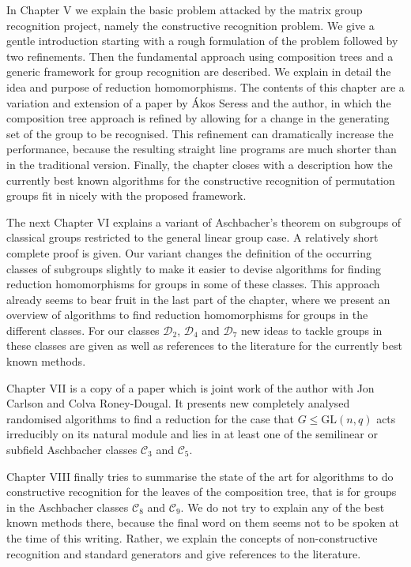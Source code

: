 \documentclass[11pt]{article}
\begin{document}
In Chapter V we explain the basic problem attacked by the matrix group
recognition project, namely the constructive recognition problem. We
give a gentle introduction starting with a rough formulation of the
problem followed by two refinements. Then the fundamental approach using 
composition trees and a generic framework for group recognition
are described. We explain in detail the idea and purpose of reduction
homomorphisms. The contents of this chapter are a variation and
extension of a paper by \'{A}kos Seress and the author, in which the
composition tree approach is refined by allowing for a change in
the generating set of the group to be recognised. This refinement can
dramatically increase the performance, because the resulting straight
line programs are much shorter than in the traditional version. Finally,
the chapter closes with a description how the currently best known
algorithms for the constructive recognition of permutation groups fit in
nicely with the proposed framework.

The next Chapter VI explains a variant of Aschbacher’s theorem on
subgroups of classical groups restricted to the general linear group
case. A relatively short complete proof is given. Our variant changes
the definition of the occurring classes of subgroups slightly to make
it easier to devise algorithms for finding reduction homomorphisms
for groups in some of these classes. This approach already seems
to bear fruit in the last part of the chapter, where we present an
overview of algorithms to find reduction homomorphisms for groups in the
different classes. For our classes $\mathcal{D}_2$, $\mathcal{D}_4$ and
$\mathcal{D}_7$ new ideas to tackle groups in these classes are given
as well as references to the literature for the currently best known
methods.

Chapter VII is a copy of a paper which is joint work of the author
with Jon Carlson and Colva Roney-Dougal. It presents new completely
analysed randomised algorithms to find a reduction for the case that
$G \le \mathrm{GL}(n, q)$ acts irreducibly on its natural module and
lies in at least one of the semilinear or subfield Aschbacher classes
$\mathcal{C}_3$ and $\mathcal{C}_5$.

Chapter VIII finally tries to summarise the state of the art for
algorithms to do constructive recognition for the leaves of the
composition tree, that is for groups in the Aschbacher classes
$\mathcal{C}_8$ and $\mathcal{C}_9$. We do not try to explain any of the
best known methods there, because the final word on them seems not to be
spoken at the time of this writing. Rather, we explain the concepts of
non-constructive recognition and standard generators and give references
to the literature.
\end{document}
